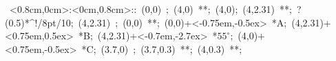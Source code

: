 \hbox{
\xy    <0.8cm,0cm>:<0cm,0.8cm>::
       (0,0) ; (4,0) **\dir{-};
       (4,0); (4,2.31) **\dir{-}; ?(0.5)*^!/8pt/{10}; 
       (4,2.31) ; (0,0) **\dir{-};  
       (0,0)+<-0.75em,-0.5ex> *{A};
       (4,2.31)+<0.75em,0.5ex> *{B};
       (4,2.31)+<-0.7em,-2.7ex> *\hbox{$55^\circ$};
       (4,0)+<0.75em,-0.5ex> *{C};
	(3.7,0) ; (3.7,0.3) **\dir{-}; (4,0.3) **\dir{-};
       \endxy}
	   
